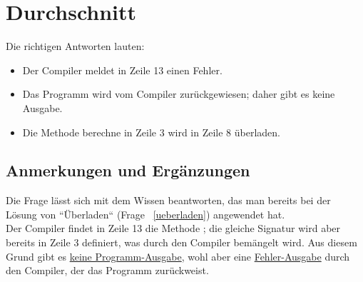 \chapter{Durchschnitt}

Die richtigen Antworten lauten:

\begin{itemize}
    \item Der Compiler meldet in Zeile 13 einen Fehler.
    \item Das Programm wird vom Compiler zurückgewiesen; daher gibt es keine Ausgabe.
    \item Die Methode berechne in Zeile 3 wird in Zeile 8 überladen.
\end{itemize}


\section*{Anmerkungen und Ergänzungen}

Die Frage lässt sich mit dem Wissen beantworten, das man bereits bei der Lösung von ``Überladen`` (Frage ~\ref{ueberladen}) angewendet hat.\\

Der Compiler findet in Zeile 13 die Methode ; die gleiche Signatur wird aber bereits in Zeile 3
definiert, was durch den Compiler bemängelt wird.
Aus diesem Grund gibt es \underline{keine Programm-Ausgabe}, wohl aber
eine \underline{Fehler-Ausgabe} durch den Compiler, der das Programm zurückweist.
